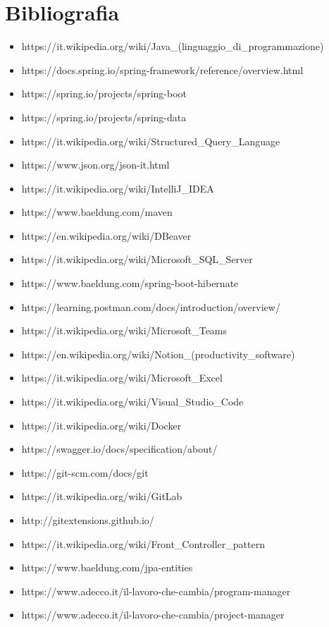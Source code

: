 \cleardoublepage
\chapter{Bibliografia}

\nocite{*}

\printbibliography[heading=subbibliography,title={Riferimenti bibliografici},type=book]

\printbibliography[heading=subbibliography,title={Siti web consultati},type=online]

\begin{itemize}
\item https://it.wikipedia.org/wiki/Java\_(linguaggio\_di\_programmazione)
\item https://docs.spring.io/spring-framework/reference/overview.html
\item https://spring.io/projects/spring-boot
\item https://spring.io/projects/spring-data
\item https://it.wikipedia.org/wiki/Structured\_Query\_Language
\item https://www.json.org/json-it.html
\item https://it.wikipedia.org/wiki/IntelliJ\_IDEA
\item https://www.baeldung.com/maven
\item https://en.wikipedia.org/wiki/DBeaver
\item https://it.wikipedia.org/wiki/Microsoft\_SQL\_Server
\item https://www.baeldung.com/spring-boot-hibernate
\item https://learning.postman.com/docs/introduction/overview/
\item https://it.wikipedia.org/wiki/Microsoft\_Teams
\item https://en.wikipedia.org/wiki/Notion\_(productivity\_software)
\item https://it.wikipedia.org/wiki/Microsoft\_Excel
\item https://it.wikipedia.org/wiki/Visual\_Studio\_Code
\item https://it.wikipedia.org/wiki/Docker
\item https://swagger.io/docs/specification/about/
\item https://git-scm.com/docs/git
\item https://it.wikipedia.org/wiki/GitLab
\item http://gitextensions.github.io/
\item https://it.wikipedia.org/wiki/Front\_Controller\_pattern
\item https://www.baeldung.com/jpa-entities
\item https://www.adecco.it/il-lavoro-che-cambia/program-manager
\item https://www.adecco.it/il-lavoro-che-cambia/project-manager

\end{itemize}